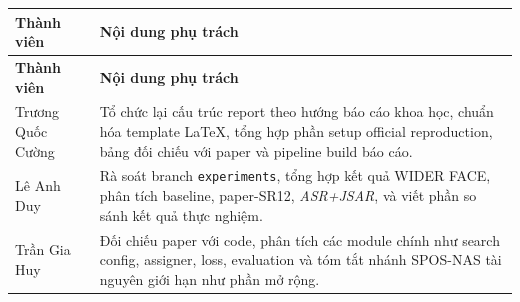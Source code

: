 \begingroup
\renewcommand{\arraystretch}{1.20}
\small
\begin{longtable}{@{}>{\RaggedRight\arraybackslash}p{}>{\RaggedRight\arraybackslash}p{}@{}}
\toprule
\textbf{Thành viên} & \textbf{Nội dung phụ trách} \\
\midrule
\endfirsthead
\toprule
\textbf{Thành viên} & \textbf{Nội dung phụ trách} \\
\midrule
\endhead
Trương Quốc Cường &
Tổ chức lại cấu trúc report theo hướng báo cáo khoa học, chuẩn hóa template LaTeX, tổng hợp phần setup official reproduction, bảng đối chiếu với paper và pipeline build báo cáo. \\
\midrule
Lê Anh Duy &
Rà soát branch \texttt{experiments}, tổng hợp kết quả WIDER FACE, phân tích baseline, paper-SR12, \textit{ASR+JSAR}, và viết phần so sánh kết quả thực nghiệm. \\
\midrule
Trần Gia Huy &
Đối chiếu paper với code, phân tích các module chính như search config, assigner, loss, evaluation và tóm tắt nhánh SPOS-NAS tài nguyên giới hạn như phần mở rộng. \\
\bottomrule
\end{longtable}
\endgroup

